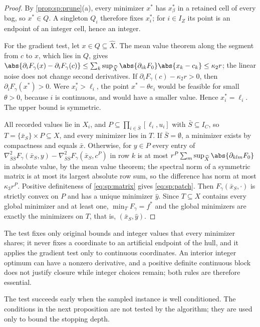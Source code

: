 \begin{proof}
By \cref{prop:sp:prune}(a), every minimizer $x^*$ has $x^*_\beta$ in a
retained cell of every bag, so $x^*\in Q$. A singleton $Q_i$ therefore fixes
$x_i^*$; for $i\in I_Z$ its point is an endpoint of an integer cell, hence an
integer.

For the gradient test, let $x\in Q\subseteq\widehat X$. The mean value
theorem along the segment from $c$ to $x$, which lies in $Q$, gives
$\abs{\partial_iF_\gamma(x)-\partial_iF_\gamma(c)}\le\sum_k\sup_{\widehat X}
\abs{\partial_{ik}F_0}\abs{x_k-c_k}\le\kappa_2r$; the linear noise does not
change second derivatives. If $\partial_iF_\gamma(c)-\kappa_2r>0$, then
$\partial_iF_\gamma(x^*)>0$. Were $x^*_i>\ell_i$, the point
$x^*-\theta e_i$ would be feasible for small $\theta>0$, because $i$ is
continuous, and would have a smaller value. Hence $x^*_i=\ell_i$. The upper
bound is symmetric.

All recorded values lie in $X_i$, and $P\subseteq\prod_{i\in\bar S}[\ell_i,u_i]$
with $\bar S\subseteq I_C$, so $T=\{\bar x_S\}\times P\subseteq X$, and every
minimizer lies in $T$. If $\bar S=\emptyset$, a minimizer exists by
compactness and equals $\bar x$. Otherwise, for $y\in P$ every entry of
$\nabla^2_{\bar S\bar S}F_\gamma(\bar x_S,y)-\nabla^2_{\bar S\bar S}F_\gamma(\bar x_S,c^P)$
in row $k$ is at most $r^P\sum_m\sup_{\widehat X}\abs{\partial_{klm}F_0}$ in
absolute value, by the mean value theorem; the spectral norm of a symmetric
matrix is at most its largest absolute row sum, so the difference has norm
at most $\kappa_3r^P$. Positive definiteness of \eqref{eq:sp:matrix} gives
\eqref{eq:sp:patch}. Then $F_\gamma(\bar x_S,\cdot)$ is strictly convex on
$P$ and has a unique minimizer $\hat y$. Since $T\subseteq X$ contains every
global minimizer and at least one, $\min_TF_\gamma=f^*$ and the global
minimizers are exactly the minimizers on $T$, that is, $(\bar x_S,\hat y)$.
\end{proof}

The test fixes only original bounds and integer values that every
minimizer shares; it never fixes a coordinate to an artificial endpoint of
the hull, and it applies the gradient test only to continuous coordinates.
An interior integer optimum can have a nonzero derivative, and a positive
definite continuous block does not justify closure while integer choices
remain; both rules are therefore essential.

The test succeeds early when the sampled instance is well conditioned. The
conditions in the next proposition are not tested by the algorithm; they
are used only to bound the stopping depth.

